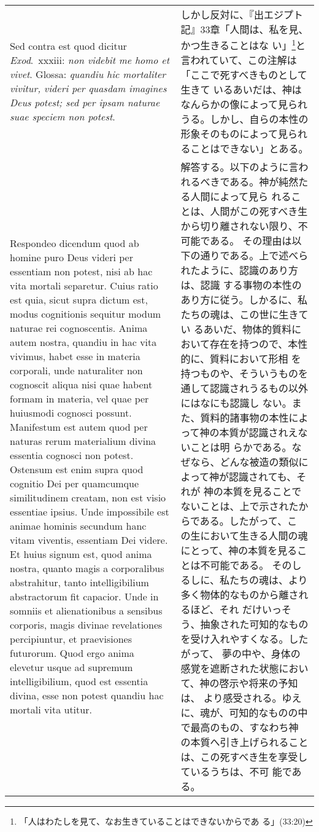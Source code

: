 \documentclass[10pt]{jsarticle} %
\begin{document}
\begin{longtable}{p{21em}p{21em}}
\\




{\sc  Sed contra est} quod dicitur {\it Exod}.~{\sc xxxiii}: {\it non videbit me
 homo et vivet}. Glossa: {\it quandiu hic mortaliter vivitur, videri per
 quasdam imagines Deus potest; sed per ipsam naturae suae speciem non
 potest}.


&

しかし反対に、『出エジプト記』33章「人間は、私を見、かつ生きることはな
い」\footnote{「人はわたしを見て、なお生きていることはできないからであ
る」(33:20)}と言われていて、この注解は「ここで死すべきものとして生きて
いるあいだは、神はなんらかの像によって見られうる。しかし、自らの本性の
形象そのものによって見られることはできない」とある。


\\

{\sc  Respondeo dicendum} quod ab homine puro Deus videri per
 essentiam non potest, nisi ab hac vita mortali separetur. Cuius ratio
 est quia, sicut supra dictum est, modus cognitionis sequitur modum
 naturae rei cognoscentis. Anima autem nostra, quandiu in hac vita
 vivimus, habet esse in materia corporali, unde naturaliter non
 cognoscit aliqua nisi quae habent formam in materia, vel quae per
 huiusmodi cognosci possunt. Manifestum est autem quod per naturas rerum
 materialium divina essentia cognosci non potest. Ostensum est enim
 supra quod cognitio Dei per quamcumque similitudinem creatam, non est
 visio essentiae ipsius. Unde impossibile est animae hominis secundum
 hanc vitam viventis, essentiam Dei videre. Et huius signum est, quod
 anima nostra, quanto magis a corporalibus abstrahitur, tanto
 intelligibilium abstractorum fit capacior. Unde in somniis et
 alienationibus a sensibus corporis, magis divinae revelationes
 percipiuntur, et praevisiones futurorum. Quod ergo anima elevetur usque
 ad supremum intelligibilium, quod est essentia divina, esse non potest
 quandiu hac mortali vita utitur.

&


解答する。以下のように言われるべきである。神が純然たる人間によって見ら
れることは、人間がこの死すべき生から切り離されない限り、不可能である。
その理由は以下の通りである。上で述べられたように、認識のあり方は、認識
する事物の本性のあり方に従う。しかるに、私たちの魂は、この世に生きてい
るあいだ、物体的質料において存在を持つので、本性的に、質料において形相
を持つものや、そういうものを通して認識されうるもの以外にはなにも認識し
ない。また、質料的諸事物の本性によって神の本質が認識されえないことは明
らかである。なぜなら、どんな被造の類似によって神が認識されても、それが
神の本質を見ることでないことは、上で示されたからである。したがって、こ
の生において生きる人間の魂にとって、神の本質を見ることは不可能である。
そのしるしに、私たちの魂は、より多く物体的なものから離されるほど、それ
だけいっそう、抽象された可知的なものを受け入れやすくなる。したがって、
夢の中や、身体の感覚を遮断された状態において、神の啓示や将来の予知は、
より感受される。ゆえに、魂が、可知的なものの中で最高のもの、すなわち神
の本質へ引き上げられることは、この死すべき生を享受しているうちは、不可
能である。



\end{longtable}
\end{document}
